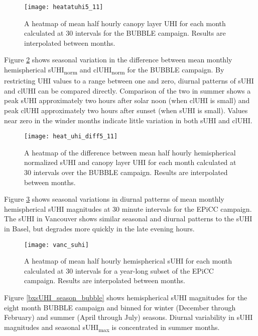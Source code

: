 \begin{bibunit}
\begin{figure}[H]
	\centering
	\texttt{[image: heatatuhi5\_11]}
	\caption{A heatmap of mean half hourly canopy layer UHI for each month calculated at 30 \si{\min} intervals for the BUBBLE campaign. Results are interpolated between months.}
	\label{heatcluhi}
\end{figure}

Figure \ref{heat_uhi_diff} shows seasonal variation in the difference between mean monthly hemispherical sUHI\textsubscript{norm} and clUHI\textsubscript{norm} for the BUBBLE campaign. By restricting UHI values to a range between one and zero, diurnal patterns of sUHI and clUHI can be compared directly. Comparison of the two in summer shows a peak sUHI approximately two hours after solar noon (when clUHI is small) and peak clUHI approximately two hours after sunset (when sUHI is small). Values near zero in the winder months indicate little variation in both sUHI and clUHI.

\begin{figure}[H]
	\centering
	\texttt{[image: heat\_uhi\_diff5\_11]}
	\caption{A heatmap of the difference between mean half hourly hemispherical normalized sUHI and canopy layer UHI for each month calculated at 30 \si{\min} intervals over the BUBBLE campaign. Results are interpolated between months.}
	\label{heat_uhi_diff}
\end{figure}

Figure \ref{vanc_suhi} shows seasonal variations in diurnal patterns of mean monthly hemispherical sUHI magnitudes at 30 minute intervals for the EPiCC campaign. The sUHI in Vancouver shows similar seasonal and diurnal patterns to the sUHI in Basel, but degrades more quickly in the late evening hours.

\begin{figure}[H]
	\centering
	\texttt{[image: vanc\_suhi]}
	\caption{A heatmap of mean half hourly hemispherical sUHI for each month calculated at 30 \si{\min} intervals for a year-long subset of the EPiCC campaign. Results are interpolated between months.}
	\label{vanc_suhi}
\end{figure}

Figure \ref{bxsUHI_season_bubble} shows hemispherical sUHI magnitudes for the eight month BUBBLE campaign and binned for winter (December through February) and summer (April through July) seasons. Diurnal variability in sUHI magnitudes and seasonal sUHI\textsubscript{max} is concentrated in summer months. 


\end{bibunit}
